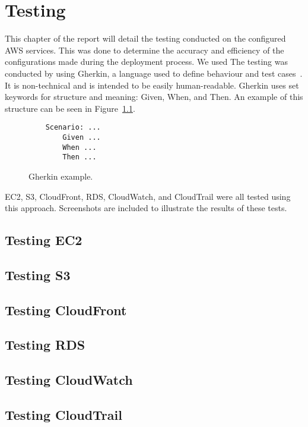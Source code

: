 \chapter{Testing}\label{ch:testing}

This chapter of the report will detail the testing conducted on the configured AWS services.
This was done to determine the accuracy and efficiency of the configurations made during the deployment process.
We used
The testing was conducted by using Gherkin, a language used to define behaviour and test
cases~\parencite{dos2018automated}.
It is non-technical and is intended to be easily human-readable.
Gherkin uses set keywords for structure and meaning: Given, When, and Then.
An example of this structure can be seen in Figure~\ref{fig:gherkin}.

\begin{figure}[!htbp]
    \centering
    \begin{verbatim}
    Scenario: ...
        Given ...
        When ...
        Then ...
    \end{verbatim}
    \caption{Gherkin example.}\label{fig:gherkin}
\end{figure}

EC2, S3, CloudFront, RDS, CloudWatch, and CloudTrail were all tested using this approach.
Screenshots are included to illustrate the results of these tests.

\section{Testing EC2}\label{sec:testing-ec2}

\section{Testing S3}\label{sec:testing-s3}

\section{Testing CloudFront}\label{sec:testing-cloudfront}

\section{Testing RDS}\label{sec:testing-rds}

\section{Testing CloudWatch}\label{sec:testing-cloudwatch}

\section{Testing CloudTrail}\label{sec:testing-cloudtrail}
